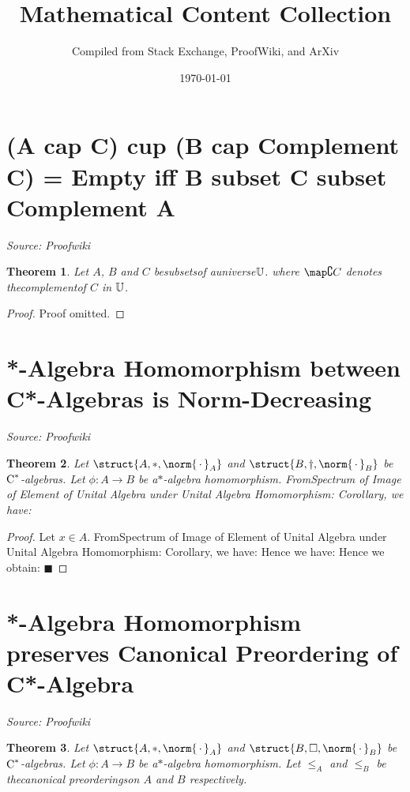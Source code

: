 \documentclass{article}
\title{Mathematical Content Collection}
\author{Compiled from Stack Exchange, ProofWiki, and ArXiv}
\date{\today}
\newtheorem{theorem}{Theorem}
\begin{document}
\maketitle
\tableofcontents
\newpage

\section{(A cap C) cup (B cap Complement C) = Empty iff B subset C subset Complement A}
\textit{Source: Proofwiki}

\begin{theorem}
Let $A$, $B$ and $C$ besubsetsof auniverse$\Bbb U$. where $\map \complement C$ denotes thecomplementof $C$ in $\Bbb U$.
\end{theorem}

\begin{proof}
Proof omitted.
\end{proof}

\newpage

\section{*-Algebra Homomorphism between C*-Algebras is Norm-Decreasing}
\textit{Source: Proofwiki}

\begin{theorem}
Let $\struct {A, \ast, \norm {\, \cdot \,}_A}$ and $\struct {B, \dagger, \norm {\, \cdot \,}_B}$ be$\text C^\ast$-algebras. Let $\phi : A \to B$ be a$\ast$-algebra homomorphism. FromSpectrum of Image of Element of Unital Algebra under Unital Algebra Homomorphism: Corollary, we have:
\end{theorem}

\begin{proof}
Let $x \in A$. FromSpectrum of Image of Element of Unital Algebra under Unital Algebra Homomorphism: Corollary, we have: Hence we have: Hence we obtain: $\blacksquare$
\end{proof}

\newpage

\section{*-Algebra Homomorphism preserves Canonical Preordering of C*-Algebra}
\textit{Source: Proofwiki}

\begin{theorem}
Let $\struct {A, \ast, \norm {\, \cdot \,}_A}$ and $\struct {B, \square, \norm {\, \cdot \,}_B}$ be$\text C^\ast$-algebras. Let $\phi : A \to B$ be a$\ast$-algebra homomorphism. Let $\le_A$ and $\le_B$ be thecanonical preorderingson $A$ and $B$ respectively.
\end{theorem}
\end{document}

